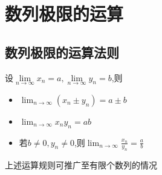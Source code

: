 \documentclass[12pt, a4paper, oneside, UTF8]{ctexbook}
\begin{document}
\begin{sloppypar}
    \section{数列极限的运算}
    \subsection{数列极限的运算法则}
    设$\underset{n\to\infty}{\operatorname*{lim}}x_{n}=a,\underset{n\to\infty}{\operatorname*{lim}}y_{n}=b$,则
    \begin{itemize}
        \item $\operatorname*{lim}_{n\to\infty}(x_n\pm y_n)=a\pm b$
        \item $\lim_{n\to\infty}x_{n}y_{n}=ab$
        \item 若$b \neq 0,y_n \neq 0$,则$\lim_{n\to\infty}\frac{x_n}{y_n}=\frac{a}{b}$
    \end{itemize}
    上述运算规则可推广至有限个数列的情况

\end{sloppypar}
\end{document}
